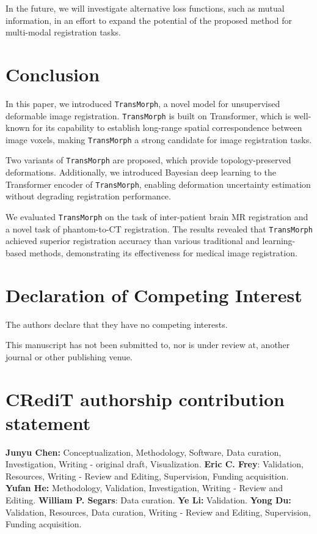 \documentclass[times,twocolumn,final]{elsarticle}
\begin{document}
In the future, we will investigate alternative loss functions, such as mutual information, in an effort to expand the potential of the proposed method for multi-modal registration tasks.

\section{Conclusion}
\label{sec:conclusion}
In this paper, we introduced \texttt{TransMorph}, a novel model for unsupervised deformable image registration. \texttt{TransMorph} is built on Transformer, which is well-known for its capability to establish long-range spatial correspondence between image voxels, making \texttt{TransMorph} a strong candidate for image registration tasks.

Two variants of \texttt{TransMorph} are proposed, which provide topology-preserved deformations. Additionally, we introduced Bayesian deep learning to the Transformer encoder of \texttt{TransMorph}, enabling deformation uncertainty estimation without degrading registration performance.

We evaluated \texttt{TransMorph} on the task of inter-patient brain MR registration and a novel task of phantom-to-CT registration. The results revealed that \texttt{TransMorph} achieved superior registration accuracy than various traditional and learning-based methods, demonstrating its effectiveness for medical image registration.

\section*{Declaration of Competing Interest}
The authors declare that they have no competing interests.

This manuscript has not been submitted to, nor is under review
at, another journal or other publishing venue.

\section*{CRediT authorship contribution statement}
\textbf{Junyu Chen:} Conceptualization, Methodology, Software, Data curation, Investigation, Writing - original draft, Visualization. \textbf{Eric C. Frey}: Validation, Resources, Writing - Review and Editing, Supervision, Funding acquisition. \textbf{Yufan He:} Methodology, Validation, Investigation, Writing - Review and Editing. \textbf{William P. Segars}: Data curation. \textbf{Ye Li:} Validation. \textbf{Yong Du:} Validation, Resources, Data curation, Writing - Review and Editing, Supervision, Funding acquisition.
\end{document}
